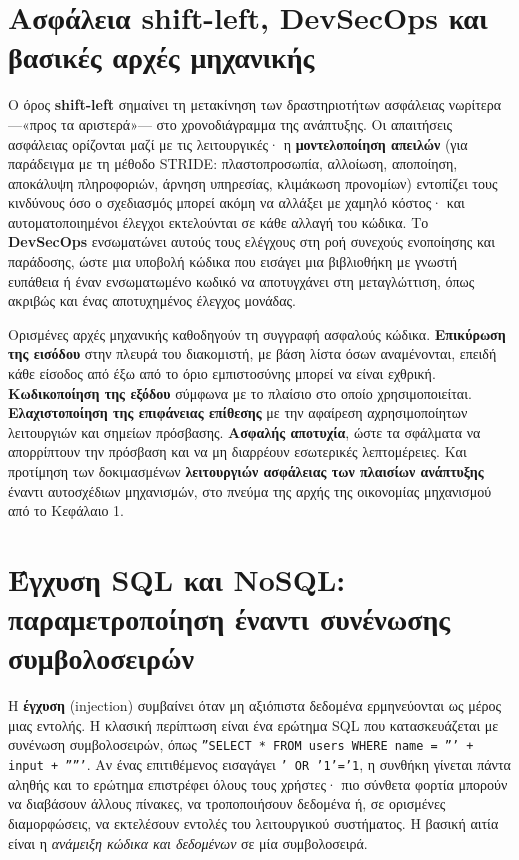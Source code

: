 \section{Ασφάλεια shift-left, DevSecOps και βασικές αρχές μηχανικής}\label{sec:9.1}
Ο όρος \textbf{shift-left} σημαίνει τη μετακίνηση των δραστηριοτήτων ασφάλειας νωρίτερα —«προς τα αριστερά»— στο χρονοδιάγραμμα της ανάπτυξης. Οι απαιτήσεις ασφάλειας ορίζονται μαζί με τις λειτουργικές· η \textbf{μοντελοποίηση απειλών} (για παράδειγμα με τη μέθοδο STRIDE: πλαστοπροσωπία, αλλοίωση, αποποίηση, αποκάλυψη πληροφοριών, άρνηση υπηρεσίας, κλιμάκωση προνομίων) εντοπίζει τους κινδύνους όσο ο σχεδιασμός μπορεί ακόμη να αλλάξει με χαμηλό κόστος· και αυτοματοποιημένοι έλεγχοι εκτελούνται σε κάθε αλλαγή του κώδικα. Το \textbf{DevSecOps} ενσωματώνει αυτούς τους ελέγχους στη ροή συνεχούς ενοποίησης και παράδοσης, ώστε μια υποβολή κώδικα που εισάγει μια βιβλιοθήκη με γνωστή ευπάθεια ή έναν ενσωματωμένο κωδικό να αποτυγχάνει στη μεταγλώττιση, όπως ακριβώς και ένας αποτυχημένος έλεγχος μονάδας.

Ορισμένες αρχές μηχανικής καθοδηγούν τη συγγραφή ασφαλούς κώδικα. \textbf{Επικύρωση της εισόδου} στην πλευρά του διακομιστή, με βάση λίστα όσων αναμένονται, επειδή κάθε είσοδος από έξω από το όριο εμπιστοσύνης μπορεί να είναι εχθρική. \textbf{Κωδικοποίηση της εξόδου} σύμφωνα με το πλαίσιο στο οποίο χρησιμοποιείται. \textbf{Ελαχιστοποίηση της επιφάνειας επίθεσης} με την αφαίρεση αχρησιμοποίητων λειτουργιών και σημείων πρόσβασης. \textbf{Ασφαλής αποτυχία}, ώστε τα σφάλματα να απορρίπτουν την πρόσβαση και να μη διαρρέουν εσωτερικές λεπτομέρειες. Και προτίμηση των δοκιμασμένων \textbf{λειτουργιών ασφάλειας των πλαισίων ανάπτυξης} έναντι αυτοσχέδιων μηχανισμών, στο πνεύμα της αρχής της οικονομίας μηχανισμού από το Κεφάλαιο 1.

\section{Έγχυση SQL και NoSQL: παραμετροποίηση έναντι συνένωσης συμβολοσειρών}\label{sec:9.2}
Η \textbf{έγχυση} (injection) συμβαίνει όταν μη αξιόπιστα δεδομένα ερμηνεύονται ως μέρος μιας εντολής. Η κλασική περίπτωση είναι ένα ερώτημα SQL που κατασκευάζεται με συνένωση συμβολοσειρών, όπως \texttt{''SELECT * FROM users WHERE name = ''' + input + '''''}. Αν ένας επιτιθέμενος εισαγάγει \texttt{' OR '1'='1}, η συνθήκη γίνεται πάντα αληθής και το ερώτημα επιστρέφει όλους τους χρήστες· πιο σύνθετα φορτία μπορούν να διαβάσουν άλλους πίνακες, να τροποποιήσουν δεδομένα ή, σε ορισμένες διαμορφώσεις, να εκτελέσουν εντολές του λειτουργικού συστήματος. Η βασική αιτία είναι η \emph{ανάμειξη κώδικα και δεδομένων} σε μία συμβολοσειρά.

